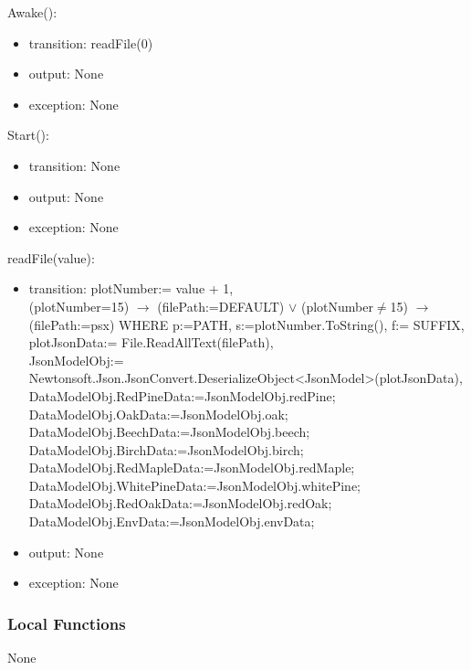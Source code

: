 \documentclass[12pt, titlepage]{article}
\begin{document}
\noindent Awake():
\begin{itemize}
\item transition: readFile(0)
\item output: None 
\item exception: None 
\end{itemize}
\noindent Start():
\begin{itemize}
\item transition: None
\item output: None 
\item exception: None 
\end{itemize}
\noindent readFile(value):
\begin{itemize}
\item transition: plotNumber:= value + 1,\\
(plotNumber=15) $\rightarrow$ (filePath:=DEFAULT) $\lor$ (plotNumber$\neq$15) $\rightarrow$ (filePath:=psx) WHERE p:=PATH, s:=plotNumber.ToString(), f:= SUFFIX,\\
plotJsonData:= File.ReadAllText(filePath),\\
JsonModelObj:= Newtonsoft.Json.JsonConvert.DeserializeObject<JsonModel>(plotJsonData),\\
        DataModelObj.RedPineData:=JsonModelObj.redPine;\\
        DataModelObj.OakData:=JsonModelObj.oak;\\
        DataModelObj.BeechData:=JsonModelObj.beech;\\
        DataModelObj.BirchData:=JsonModelObj.birch;\\
        DataModelObj.RedMapleData:=JsonModelObj.redMaple;\\
        DataModelObj.WhitePineData:=JsonModelObj.whitePine;\\
        DataModelObj.RedOakData:=JsonModelObj.redOak;\\
        DataModelObj.EnvData:=JsonModelObj.envData;\\
        
\item output: None 
\item exception: None 
\end{itemize}
\subsubsection{Local Functions}
None

\newpage

\end{document}
